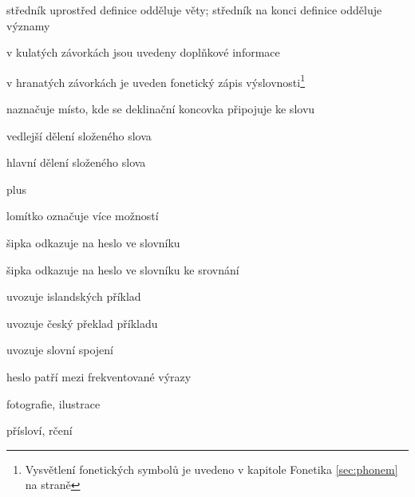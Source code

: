 \item[{;}] {středník uprostřed definice odděluje věty; středník na konci definice odděluje významy}

\item[{(...)}] {v kulatých závorkách jsou uvedeny doplňkové informace}
\item[{[...]}] {v hranatých závorkách je uveden fonetický zápis výslovnosti}\footnote{Vysvětlení fonetických symbolů je uvedeno v kapitole Fonetika \ref{sec:phonem} na straně \pageref{sec:phonem}}
\item[{|}] {naznačuje místo, kde se deklinační koncovka připojuje ke slovu}
\item[{·}] {vedlejší dělení složeného slova}
\item[{··}] {hlavní dělení složeného slova}
\item[{+}] {plus}
\item[{/}] {lomítko označuje více možností}
\item[{\dicsymSee}] {šipka odkazuje na heslo ve slovníku}
\item[{\dicsymCompare}] {šipka odkazuje na heslo ve slovníku ke srovnání}
\item[{\dicsymExampleIS}] {uvozuje islandských příklad}
\item[{\dicsymExampleCS}] {uvozuje český překlad příkladu}
\item[{\dicsymIdiom}] {uvozuje slovní spojení}
\item[{\dicsymFrequent}] {heslo patří mezi frekventované výrazy}

\item[{\dicsymPhoto}] {fotografie, ilustrace}
\item[{\dicsymProverb}] {přísloví, rčení}
